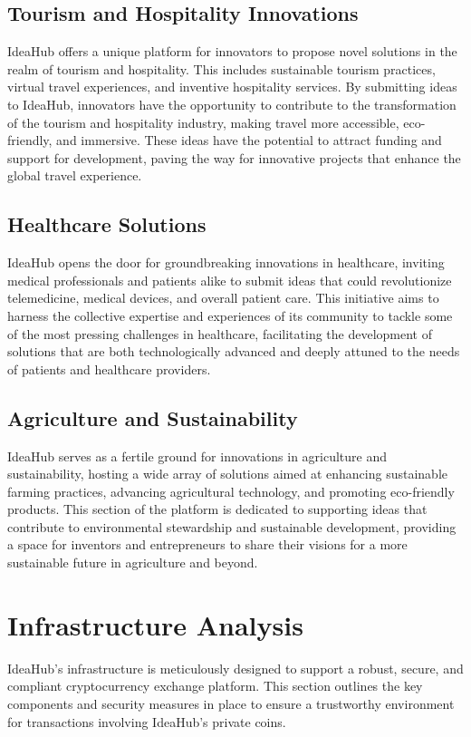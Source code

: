 \documentclass{article}
\begin{document}
	
	\subsection{Tourism and Hospitality Innovations}
	IdeaHub offers a unique platform for innovators to propose novel solutions in the realm of tourism and hospitality. This includes sustainable tourism practices, virtual travel experiences, and inventive hospitality services. By submitting ideas to IdeaHub, innovators have the opportunity to contribute to the transformation of the tourism and hospitality industry, making travel more accessible, eco-friendly, and immersive. These ideas have the potential to attract funding and support for development, paving the way for innovative projects that enhance the global travel experience.
	
	
	\subsection{Healthcare Solutions}
	IdeaHub opens the door for groundbreaking innovations in healthcare, inviting medical professionals and patients alike to submit ideas that could revolutionize telemedicine, medical devices, and overall patient care. This initiative aims to harness the collective expertise and experiences of its community to tackle some of the most pressing challenges in healthcare, facilitating the development of solutions that are both technologically advanced and deeply attuned to the needs of patients and healthcare providers.
	
	
	\subsection{Agriculture and Sustainability}
	IdeaHub serves as a fertile ground for innovations in agriculture and sustainability, hosting a wide array of solutions aimed at enhancing sustainable farming practices, advancing agricultural technology, and promoting eco-friendly products. This section of the platform is dedicated to supporting ideas that contribute to environmental stewardship and sustainable development, providing a space for inventors and entrepreneurs to share their visions for a more sustainable future in agriculture and beyond.
	
	
	\section{Infrastructure Analysis}
	IdeaHub's infrastructure is meticulously designed to support a robust, secure, and compliant cryptocurrency exchange platform. This section outlines the key components and security measures in place to ensure a trustworthy environment for transactions involving IdeaHub's private coins.
	
\end{document}
